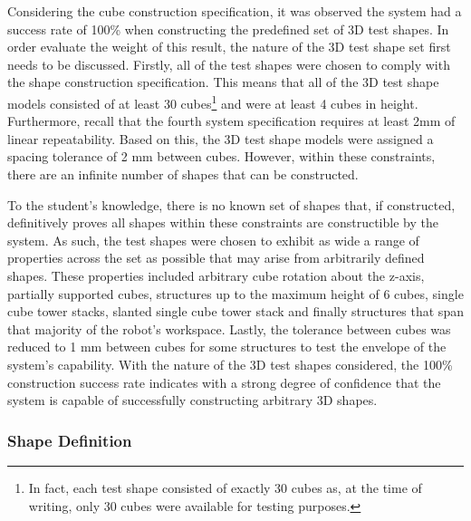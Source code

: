 
Considering the cube construction specification, it was observed the system had a success rate of 100\% when constructing the predefined set of 3D test shapes. In order evaluate the weight of this result, the nature of the 3D test shape set first needs to be discussed. Firstly, all of the test shapes were chosen to comply with the shape construction specification. This means that all of the 3D test shape models consisted of at least 30 cubes\footnote{In fact, each test shape consisted of exactly 30 cubes as, at the time of writing, only 30 cubes were available for testing purposes.} and were at least 4 cubes in height. Furthermore, recall that the fourth system specification requires at least 2mm of linear repeatability. Based on this, the 3D test shape models were assigned a spacing tolerance of 2 mm between cubes. However, within these constraints, there are an infinite number of shapes that can be constructed. 

To the student's knowledge, there is no known set of shapes that, if constructed, definitively proves all shapes within these constraints are constructible by the system. As such, the test shapes were chosen to exhibit as wide a range of properties across the set as possible that may arise from arbitrarily defined shapes. These properties included arbitrary cube rotation about the z-axis, partially supported cubes, structures up to the maximum height of 6 cubes, single cube tower stacks, slanted single cube tower stack and finally structures that span that majority of the robot's workspace. Lastly, the tolerance between cubes was reduced to 1 mm between cubes for some structures to test the envelope of the system's capability. With the nature of the 3D test shapes considered, the 100\% construction success rate indicates with a strong degree of confidence that the system is capable of successfully constructing arbitrary 3D shapes.

\subsubsection{Shape Definition}

